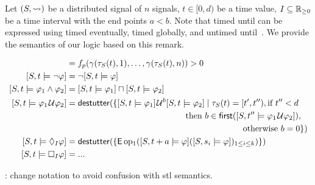 Let $(S, {\rightsquigarrow})$ be a distributed signal of $n$ signals, $t \in [0,d)$ be a time value, $I \subseteq \mathbb{R}_{\geq 0}$ be a time interval with the end points $a < b$.
Note that timed until can be expressed using timed eventually, timed globally, and untimed until~\cite{DBLP:journals/sttt/MalerN13}.
We provide the semantics of our logic based on this remark. %

%

\begin{align*}
	[S,t \models p] &=  f_p(\gamma(\tau_S(t), 1), \ldots, \gamma(\tau_S(t), n)) > 0 \\
	[S,t \models \lnot \varphi] &= \lnot [S,t \models \varphi] \\
	[S,t \models \varphi_1 \land \varphi_2] &= [S,t \models \varphi_1] \sqcap [S,t \models \varphi_2] \\
	[S,t \models \varphi_1 \until \varphi_2] &= \destutter(\{ [S,t \models \varphi_1] \until^b [S,t \models \varphi_2] \st \tau_S(t) = [t',t''), \text{if $t'' < d$} \\
	&\hspace{14em} \text{then } b \in \first([S,t'' \models \varphi_1 \until \varphi_2]), \\
	&\hspace{20.75em} \text{otherwise } b = 0 \}) \\
	[S,t \models \LTLf_I \varphi] &= \destutter(\{ \mathsf{E} \operatorname{op_1}([S,t+a \models \varphi] ([S, s_i \models \varphi])_{1 \leq i \leq k})  \}) \\
	[S,t \models \LTLg_I \varphi] &= ...
\end{align*}


\TODO: change notation to avoid confusion with stl semantics.


